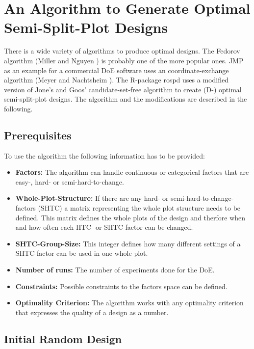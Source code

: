 \section{An Algorithm to Generate Optimal Semi-Split-Plot Designs} \label{algo}

There is a wide variety of algorithms to produce optimal designs. The Fedorov algorithm (Miller and Nguyen \cite{fedorovalg}) is probably one of the more popular ones. JMP as an example for a commercial DoE software uses an coordinate-exchange algorithm (Meyer and Nachtsheim \cite{coordexchange}). The R-package rospd uses a modified version of Jone's and Goos' \cite{jones:optimalalg} candidate-set-free algorithm to create (D-) optimal semi-split-plot designs. The algorithm and the modifications are described in the following.

\subsection{Prerequisites}

To use the algorithm the following information has to be provided:

\begin{itemize}
	\item \textbf{Factors:} The algorithm can handle continuous or categorical factors that are easy-, hard- or semi-hard-to-change.
	\item \textbf{Whole-Plot-Structure:} If there are any hard- or semi-hard-to-change-factors (SHTC) a matrix representing the whole plot structure needs to be defined. This matrix defines the whole plots of the design and therfore when and how often each HTC- or SHTC-factor can be changed.
	\item \textbf{SHTC-Group-Size:} This integer defines how many different settings of a SHTC-factor can be used in one whole plot.
	\item \textbf{Number of runs:} The number of experiments done for the DoE.
	\item \textbf{Constraints:} Possible constraints to the factors space can be defined.
	\item \textbf{Optimality Criterion:} The algorithm works with any optimality criterion that expresses the quality of a design as a number.
\end{itemize}

\subsection{Initial Random Design}

